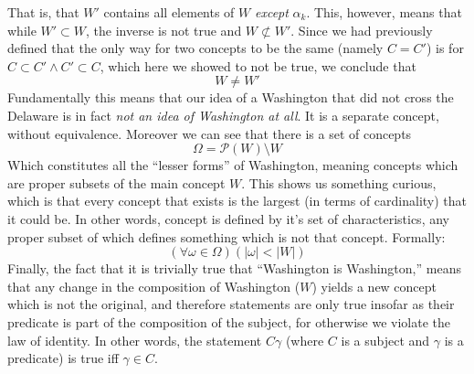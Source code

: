\documentclass{article}
\begin{document}
That is, that \(W'\) contains all elements of \(W\) \emph{except} \(\alpha_k\). This, however, means that while \(W' \subset W\), the inverse is not true and \(W \not\subset W'\). Since we had previously defined that the only way for two concepts to be the same (namely \(C = C'\)) is for \(C \subset C' \land C' \subset C\), which here we showed to not be true, we conclude that
    \[W \neq W'\]
Fundamentally this means that our idea of a Washington that did not cross the Delaware is in fact \emph{not an idea of Washington at all}. It is a separate concept, without equivalence. Moreover we can see that there is a set of concepts
    \[\Omega = \mathcal P(W)\setminus W\]
Which constitutes all the ``lesser forms'' of Washington, meaning concepts which are proper subsets of the main concept \(W\). This shows us something curious, which is that every concept that exists is the largest (in terms of cardinality) that it could be. In other words, concept is defined by it's set of characteristics, any proper subset of which defines something which is not that concept. Formally:
    \[(\forall \omega \in \Omega)(|\omega| < |W|)\]
Finally, the fact that it is trivially true that ``Washington is Washington,'' means that any change in the composition of Washington (\(W\)) yields a new concept which is not the original, and therefore statements are only true insofar as their predicate is part of the composition of the subject, for otherwise we violate the law of identity. In other words, the statement \(C\gamma\) (where \(C\) is a subject and \(\gamma\) is a predicate) is true iff \(\gamma\in C\).
\end{document}
